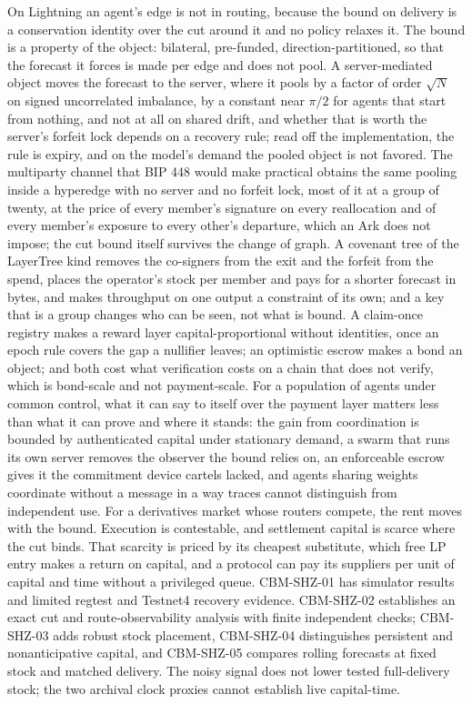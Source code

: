 \documentclass[11pt]{article}
\theoremstyle{plain}
\theoremstyle{definition}
\theoremstyle{remark}
\begin{document}
On Lightning an agent's edge is not in routing, because the bound on delivery is a conservation identity over the cut around it and no policy relaxes it. The bound is a property of the object: bilateral, pre-funded, direction-partitioned, so that the forecast it forces is made per edge and does not pool. A server-mediated object moves the forecast to the server, where it pools by a factor of order $\sqrt N$ on signed uncorrelated imbalance, by a constant near $\pi/2$ for agents that start from nothing, and not at all on shared drift, and whether that is worth the server's forfeit lock depends on a recovery rule; read off the implementation, the rule is expiry, and on the model's demand the pooled object is not favored. The multiparty channel that BIP 448 would make practical obtains the same pooling inside a hyperedge with no server and no forfeit lock, most of it at a group of twenty, at the price of every member's signature on every reallocation and of every member's exposure to every other's departure, which an Ark does not impose; the cut bound itself survives the change of graph. A covenant tree of the LayerTree kind removes the co-signers from the exit and the forfeit from the spend, places the operator's stock per member and pays for a shorter forecast in bytes, and makes throughput on one output a constraint of its own; and a key that is a group changes who can be seen, not what is bound. A claim-once registry makes a reward layer capital-proportional without identities, once an epoch rule covers the gap a nullifier leaves; an optimistic escrow makes a bond an object; and both cost what verification costs on a chain that does not verify, which is bond-scale and not payment-scale. For a population of agents under common control, what it can say to itself over the payment layer matters less than what it can prove and where it stands: the gain from coordination is bounded by authenticated capital under stationary demand, a swarm that runs its own server removes the observer the bound relies on, an enforceable escrow gives it the commitment device cartels lacked, and agents sharing weights coordinate without a message in a way traces cannot distinguish from independent use. For a derivatives market whose routers compete, the rent moves with the bound. Execution is contestable, and settlement capital is scarce where the cut binds. That scarcity is priced by its cheapest substitute, which free LP entry makes a return on capital, and a protocol can pay its suppliers per unit of capital and time without a privileged queue. CBM-SHZ-01 has simulator results and limited regtest and Testnet4 recovery evidence. CBM-SHZ-02 establishes an exact cut and route-observability analysis with finite independent checks; CBM-SHZ-03 adds robust stock placement, CBM-SHZ-04 distinguishes persistent and nonanticipative capital, and CBM-SHZ-05 compares rolling forecasts at fixed stock and matched delivery. The noisy signal does not lower tested full-delivery stock; the two archival clock proxies cannot establish live capital-time.
\end{document}
